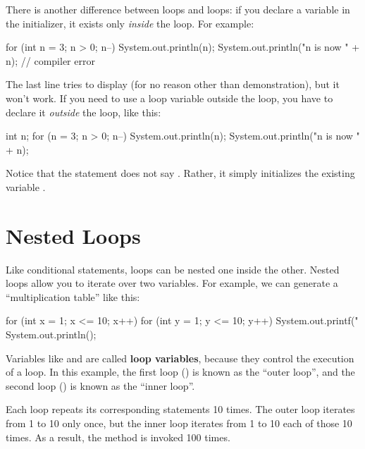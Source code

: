 There is another difference between  loops and  loops: if you declare a variable in the initializer, it exists only {\em inside} the  loop.
For example:

\begin{code}
for (int n = 3; n > 0; n--) {
    System.out.println(n);
}
System.out.println("n is now " + n);  // compiler error
\end{code}

The last line tries to display  (for no reason other than demonstration), but it won't work.
If you need to use a loop variable outside the loop, you have to declare it {\em outside} the loop, like this:

\begin{code}
int n;
for (n = 3; n > 0; n--) {
    System.out.println(n);
}
System.out.println("n is now " + n);
\end{code}

Notice that the  statement does not say .
Rather, it simply initializes the existing variable .


\section{Nested Loops}
\label{loops-strings_nested-loops}
\label{nested}


Like conditional statements, loops can be nested one inside the other.
Nested loops allow you to iterate over two variables.
For example, we can generate a ``multiplication table'' like this:

\begin{code}
for (int x = 1; x <= 10; x++) {
    for (int y = 1; y <= 10; y++) {
        System.out.printf("%
    }
    System.out.println();
}
\end{code}


Variables like  and  are called {\bf loop variables}, because they control the execution of a loop.
In this example, the first loop () is known as the ``outer loop'', and the second loop () is known as the ``inner loop''.

Each loop repeats its corresponding statements 10 times.
The outer loop iterates from 1 to 10 only once, but the inner loop iterates from 1 to 10 each of those 10 times.
As a result, the  method is invoked 100 times.

